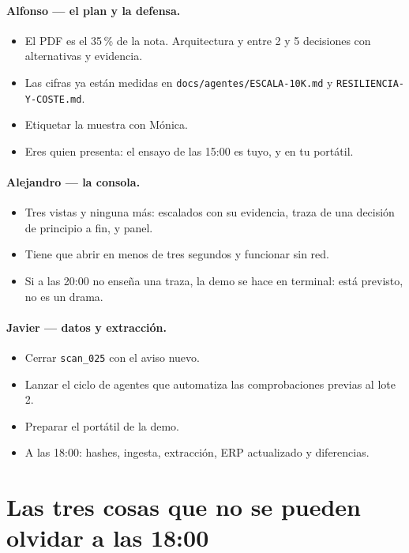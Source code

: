 \documentclass[11pt,a4paper]{article}
\newcommand{\cmd}[1]{\texttt{\small #1}}
\begin{document}
\paragraph{Alfonso — el plan y la defensa.}
\begin{itemize}
  \item El PDF es el 35\,\% de la nota. Arquitectura y entre 2 y 5 decisiones con alternativas y evidencia.
  \item Las cifras ya están medidas en \cmd{docs/agentes/ESCALA-10K.md} y \cmd{RESILIENCIA-Y-COSTE.md}.
  \item Etiquetar la muestra con Mónica.
  \item Eres quien presenta: el ensayo de las 15:00 es tuyo, y en tu portátil.
\end{itemize}

\paragraph{Alejandro — la consola.}
\begin{itemize}
  \item Tres vistas y ninguna más: escalados con su evidencia, traza de una decisión de principio a fin, y panel.
  \item Tiene que abrir en menos de tres segundos y funcionar sin red.
  \item Si a las 20:00 no enseña una traza, la demo se hace en terminal: está previsto, no es un drama.
\end{itemize}

\paragraph{Javier — datos y extracción.}
\begin{itemize}
  \item Cerrar \cmd{scan\_025} con el aviso nuevo.
  \item Lanzar el ciclo de agentes que automatiza las comprobaciones previas al lote 2.
  \item Preparar el portátil de la demo.
  \item A las 18:00: hashes, ingesta, extracción, ERP actualizado y diferencias.
\end{itemize}

\section{Las tres cosas que no se pueden olvidar a las 18:00}
\label{sec:tres}
\end{document}
